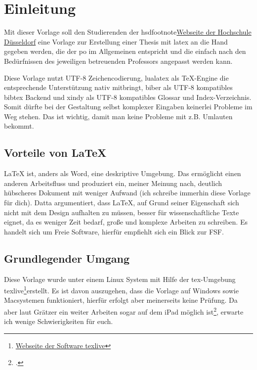 \newpage

\section{Einleitung}
Mit dieser Vorlage soll den Studierenden der \gls{hsd}footnote{\href{https://www.hs-duesseldorf.de}{Webseite der Hochschule Düsseldorf}} eine Vorlage zur Erstellung einer Thesis mit \gls{latex} an die Hand gegeben werden, die der \gls{po} im Allgemeinen entspricht und die einfach nach den Bedürfnissen des jeweiligen betreuenden Professors angepasst werden kann.

Diese Vorlage nutzt UTF-8 Zeichencodierung, lualatex als TeX-Engine die entsprechende Unterstützung nativ mitbringt, biber als UTF-8 kompatibles bibtex Backend und xindy als UTF-8 kompatibles Glossar und Index-Verzeichnis. Somit dürfte bei der Gestaltung selbst komplexer Eingaben keinerlei Probleme im Weg stehen. Das ist wichtig, damit man keine Probleme mit z.B. Umlauten bekommt.

\subsection{Vorteile von LaTeX}
LaTeX ist, anders als Word, eine deskriptive Umgebung. Das ermöglicht einen anderen Arbeitsfluss und produziert ein, meiner Meinung nach, deutlich hübscheres Dokument mit weniger Aufwand (ich schreibe immerhin diese Vorlage für dich). Datta argumentiert, dass \LaTeX{}, auf Grund seiner Eigenschaft sich nicht mit dem Design aufhalten zu müssen, besser für wissenschaftliche Texte eignet, da es weniger Zeit bedarf, große und komplexe Arbeiten zu schreiben.
Es handelt sich um Freie Software, hierfür empfiehlt sich ein Blick zur \gls{FSF}.

\subsection{Grundlegender Umgang}
Diese Vorlage wurde unter einem Linux System mit Hilfe der tex-Umgebung texlive\footnote{\href{https://tug.org/texlive/}{Webseite der Software texlive}}erstellt. Es ist davon auszugehen, dass die Vorlage auf Windows sowie Macsystemen funktioniert, hierfür erfolgt aber meinerseits keine Prüfung. Da aber laut Grätzer ein weiter Arbeiten sogar auf dem iPad möglich ist\footcite[Vgl. ][S. 179ff.]{gratzer_practical_2014}, erwarte ich wenige Schwierigkeiten für euch.

